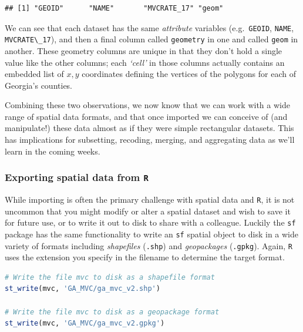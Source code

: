 \documentclass[
]{book}
\newcommand{\passthrough}[1]{#1}
\begin{document}
\begin{lstlisting}
## [1] "GEOID"      "NAME"       "MVCRATE_17" "geom"
\end{lstlisting}

We can see that each dataset has the same \emph{attribute} variables (e.g.~\passthrough{\lstinline!GEOID!}, \passthrough{\lstinline!NAME!}, \passthrough{\lstinline!MVCRATE\_17!}), and then a final column called \passthrough{\lstinline!geometry!} in one and called \passthrough{\lstinline!geom!} in another. These geometry columns are unique in that they don't hold a single value like the other columns; each \emph{`cell'} in those columns actually contains an embedded list of \(x,y\) coordinates defining the vertices of the polygons for each of Georgia's counties.

Combining these two observations, we now know that we can work with a wide range of spatial data formats, and that once imported we can conceive of (and manipulate!) these data almost as if they were simple rectangular datasets. This has implications for subsetting, recoding, merging, and aggregating data as we'll learn in the coming weeks.

\hypertarget{exporting-spatial-data-from-r}{%
\subsubsection{\texorpdfstring{Exporting spatial data from \texttt{R}}{Exporting spatial data from R}}\label{exporting-spatial-data-from-r}}

While importing is often the primary challenge with spatial data and \passthrough{\lstinline!R!}, it is not uncommon that you might modify or alter a spatial dataset and wish to save it for future use, or to write it out to disk to share with a colleague. Luckily the \passthrough{\lstinline!sf!} package has the same functionality to write an \passthrough{\lstinline!sf!} spatial object to disk in a wide variety of formats including \emph{shapefiles} (\passthrough{\lstinline!.shp!}) and \emph{geopackages} (\passthrough{\lstinline!.gpkg!}). Again, \passthrough{\lstinline!R!} uses the extension you specify in the filename to determine the target format.

\begin{lstlisting}[language=R]
# Write the file mvc to disk as a shapefile format
st_write(mvc, 'GA_MVC/ga_mvc_v2.shp')

# Write the file mvc to disk as a geopackage format
st_write(mvc, 'GA_MVC/ga_mvc_v2.gpkg')
\end{lstlisting}
\end{document}
